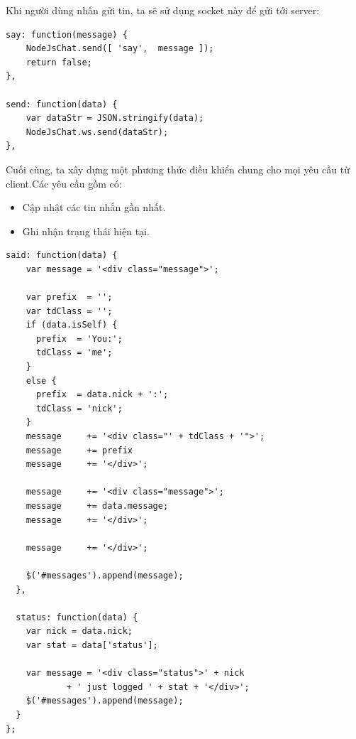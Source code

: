 Khi người dùng nhấn gửi tin, ta sẽ sử dụng socket này để gửi tới server:
	\begin{verbatim}
say: function(message) {
	NodeJsChat.send([ 'say',  message ]);
    return false;
},

send: function(data) {
	var dataStr = JSON.stringify(data);
    NodeJsChat.ws.send(dataStr);
},
	\end{verbatim}

Cuối cùng, ta xây dựng một phương thức điều khiển chung cho mọi yêu cầu từ client.Các yêu cầu gồm có:
	\begin{itemize}
		\item Cập nhật các tin nhắn gần nhất.
		\item Ghi nhận trạng thái hiện tại.
	\end{itemize}

	\begin{verbatim}
said: function(data) {
	var message = '<div class="message">';

    var prefix  = '';
    var tdClass = '';
    if (data.isSelf) {
      prefix  = 'You:';
      tdClass = 'me';
    }
    else {
      prefix  = data.nick + ':';
      tdClass = 'nick';
    }
    message     += '<div class="' + tdClass + '">';
    message     += prefix
    message     += '</div>';

    message     += '<div class="message">';
    message     += data.message;
    message     += '</div>';

    message     += '</div>';

    $('#messages').append(message);
  },

  status: function(data) {
    var nick = data.nick;
    var stat = data['status'];

    var message = '<div class="status">' + nick 
    		+ ' just logged ' + stat + '</div>';
    $('#messages').append(message);
  }
};
	\end{verbatim}
